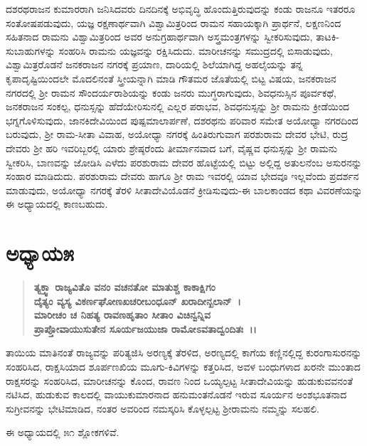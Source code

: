 ದಶರಥರಾಜನ ಕುಮಾರರಾಗಿ ಜನಿಸಿದವರು ದಿನದಿನಕ್ಕೆ ಅಭಿವೃದ್ಧಿ ಹೊಂದುತ್ತಿರುವುದನ್ನು ಕಂಡು ರಾಜನೂ ಇತರರೂ ಸಂತೋಷಪಡುವುದು, ಯಜ್ಞ ರಕ್ಷಣಾರ್ಥವಾಗಿ ವಿಶ್ವಾಮಿತ್ರರಿಂದ ರಾಮನ ಸಹಾಯಕ್ಕಾಗಿ ಪ್ರಾರ್ಥನೆ, ಲಕ್ಷಣನಿಂದ ಸಹಿತನಾದ ರಾಮನು ವಿಶ್ವಾಮಿತ್ರರಿಂದ ಅವರ ಅನುಗ್ರಹಾರ್ಥವಾಗಿ ಅಸ್ತ್ರಮಂತ್ರಗಳನ್ನು ಸ್ವೀಕರಿಸುವುದು, ತಾಟಕಿ-ಸುಬಾಹುಗಳನ್ನು ಸಂಹರಿಸಿ ರಾಮನು ಯಜ್ಞವನ್ನು ರಕ್ಷಿಸಿದುದು. ಮಾರೀಚನನ್ನು ಸಮುದ್ರದಲ್ಲಿ ಬಿಸಾಡುವುದು, ವಿಶ್ವಾಮಿತ್ರರೊಡನೆ ಜನಕರಾಜನ ನಗರಕ್ಕೆ ಪ್ರಯಾಣ, ದಾರಿಯಲ್ಲಿ ಶಿಲೆಯಾಗಿದ್ದ ಅಹಲೈಯನ್ನು ತನ್ನ ಕೃಪಾದೃಷ್ಟಿಯಿಂದಲೇ ಮೊದಲಿನಂತೆ ಸ್ತ್ರೀಯನ್ನಾಗಿ ಮಾಡಿ ಗೌತಮರ ಜೊತೆಯಲ್ಲಿ ಬಿಟ್ಟ ವಿಷಯ, ಜನಕರಾಜನ ನಗರದಲ್ಲಿ ಶ‍್ರೀ ರಾಮನ ಸೌಂದರ್ಯರಾಶಿಯನ್ನು ಕಂಡು ಜನರು ಮುಗ್ಧರಾಗುವುದು, ಶಿವಧನುಸ್ಸಿನ ಪೂರ್ವಕಥೆ, ಜನಕರಾಜನ ಸಂಕಲ್ಪ, ಧನುಸ್ಸನ್ನು ಹೆದೆಯೇರಿಸುನಲ್ಲಿ ಎಲ್ಲರ ಪರಾಭವ, ಶಿವಧನುಸ್ಸನ್ನು ಶ‍್ರೀ ರಾಮನು ಕ್ರೀಡೆಯಿಂದ ಭಗ್ನಗೊಳಿಸುವುದು, ಜಾನಕಿದೇವಿಯಿಂದ ಪುಷ್ಪಮಾಲಾರ್ಪಣೆ, ದಶರಥನು ಪರಿವಾರ ಸಮೇತ ಅಯೋಧ್ಯಾ ನಗರದಿಂದ ಬರುವುದು, ಶ‍್ರೀ ರಾಮ-ಸೀತಾ ವಿವಾಹ, ಅಯೋಧ್ಯಾ ನಗರಕ್ಕೆ ಹಿಂತಿರುಗುವಾಗ ಪರಶುರಾಮ ದೇವರ ಭೇಟಿ, ರುದ್ರ ದೇವರು ಶ‍್ರೀ ಹರಿ ಇವರಿಬ್ಬರಲ್ಲಿ ಯಾರು ಶ್ರೇಷ್ಠರೆಂದು ತೀರ್ಮಾನವಾದ ಬಗೆ, ವೈಷ್ಣವ ಧನುಸ್ಸನ್ನು ಶ‍್ರೀ ರಾಮನು ಸ್ವೀಕರಿಸಿ, ಬಾಣವನ್ನು ಜೋಡಿಸಿ ಎಳೆದು ಪರಶುರಾಮ ದೇವರ ಹೊಟ್ಟೆಯಲ್ಲಿ ಬಿಟ್ಟು ಅಲ್ಲಿದ್ದ ಅತುಲನೆಂಬ ಅಸುರನನ್ನು ಸಂಹಾರ ಮಾಡಿದುದು. ಪರಶುರಾಮ ದೇವರು ಹಾಗೂ ಶ‍್ರೀ ರಾಮ ಇವರಲ್ಲಿ ಯಾವ ಭೇದವೂ ಇಲ್ಲವೆಂದು ಪ್ರದರ್ಶನ ಮಾಡುವುದು, ಅಯೋಧ್ಯಾ ನಗರಕ್ಕೆ ತೆರಳಿ ಸೀತಾದೇವಿಯೊಡನೆ ಕ್ರೀಡಿಸುವುದು-ಈ ಬಾಲಕಾಂಡದ ಕಥಾ ವಿವರಣೆಯನ್ನು ಈ ಅಧ್ಯಾಯದಲ್ಲಿ ಕಾಣಬಹುದು.


\section*{ಅಧ್ಯಾಯ\enginline{-}೫}

\begin{verse}
\textbf{ತ್ಯಕ್ತ್ವಾ ರಾಜ್ಯವಿತೊ ವನಂ ವಚನತೋ ಮಾತುಶ್ಚ ಕಾಕಾಕ್ಷಿಗಂ} \\\textbf{ದೈತ್ಯಂ ವ್ಯಸ್ಯ ವಿಕರ್ಣಘೋಣಖಚರೀಬಂಧೂನ್ ಖರಾದೀನ್ಖಲಾನ್~।}\\\textbf{ಮಾರೀಚಂ ಚ ನಿಹತ್ಯ ರಾವಣಹೃತಾಂ ಸೀತಾಂ ವಿಚಿನ್ವನ್ನಿವ} \\\textbf{ಪ್ರಾಪ್ತೋವಾಯುಸುತೇನ ಸೂರ್ಯಜಯುಜಾ ರಾಮೋಽವತಾದ್ವಂದಿತಃ~।।}
\end{verse}

ತಾಯಿಯ ಮಾತಿನಂತೆ ರಾಜ್ಯವನ್ನು ಪರಿತ್ಯಜಿಸಿ ಅರಣ್ಯಕ್ಕೆ ತೆರಳಿದ, ಅರಣ್ಯದಲ್ಲಿ ಕಾಗೆಯ ಕಣ್ಣಿನಲ್ಲಿದ್ದ ಕುರಂಗಾಸುರನನ್ನು ಸಂಹರಿಸಿದ, ರಾಕ್ಷಸಿಯಾದ ಶೂರ್ಪಣಖಿಯ ಮೂಗು-ಕಿವಿಗಳನ್ನು ಕತ್ತರಿಸಿದ, ಅವಳ ಬಂಧುಗಳಾದ ಖರನೇ ಮುಂತಾದ ರಾಕ್ಷಸರನ್ನು ಸಂಹರಿಸಿದ, ಮಾರೀಚನನ್ನು ಕೊಂದ, ರಾವಣ ನಿಂದ ಒಯ್ಯಲ್ಪಟ್ಟ ಸೀತಾದೇವಿಯನ್ನು ಹುಡುಕುವವನಂತೆ ನಟಿಸಿದ, ಹುಡುಕುವ ಕಾಲದಲ್ಲಿ ವಾಯುಕುಮಾರನಾದ ಹನುಮಂತನೊಡನೆ ಇರುವ ಸೂರ್ಯನ ಅಂಶಭೂತನಾದ ಸುಗ್ರೀವನನ್ನು ಭೇಟಿಮಾಡಿದ, ನಂತರ ಅವರಿಂದ ನಮಸ್ಕರಿಸಿ ಕೊಳ್ಳಲ್ಪಟ್ಟ ಶ‍್ರೀರಾಮನು ನಮ್ಮನ್ನು ಸಲಹಲಿ.

ಈ ಅಧ್ಯಾಯದಲ್ಲಿ ೫೧ ಶ್ಲೋಕಗಳಿವೆ.

